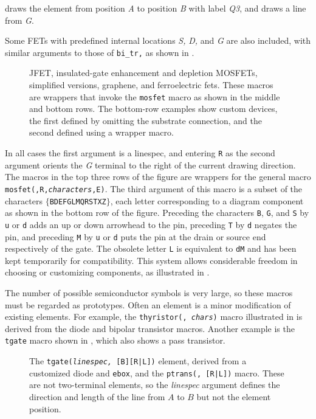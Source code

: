 \noindent
draws the element from position {\sl A} to position {\sl B} with label
{\sl Q3}, and draws a line from {\sl G}.

\enlargethispage{\baselineskip}
Some FETs with predefined internal locations {\sl S,} {\sl D,} and {\sl G} are
also included, with similar arguments to those of {\tt bi\_tr,} as shown in
.
\begin{figure}[ht]
   
   \caption{JFET, insulated-gate enhancement and depletion MOSFETs,
     simplified versions, graphene, and ferroelectric fets. 
     These macros are wrappers that invoke the {\tt mosfet}
     macro as shown in the middle and bottom rows.
     The bottom-row examples show custom devices, the first
     defined by omitting the substrate connection, and the second
     defined using a wrapper macro.}
   \label{fet}
   \end{figure}
In all cases the first argument is a linespec,
and entering
{\tt R} as the second argument orients the {\sl G} terminal to the right of the
current drawing direction.
The macros in the top three rows of the figure are wrappers for the
general macro {\tt mosfet(\linespec,R,{\sl characters},E)}.
The third argument of this macro is a subset of the characters
$\{${\tt BDEFGLMQRSTXZ}$\}$, each letter corresponding to
a diagram component as shown in the bottom row of the figure. 
Preceding the characters {\tt B}, {\tt G}, and {\tt S} by {\tt u} or {\tt d}
adds an up or down arrowhead to the pin, preceding {\tt T} by {\tt d}
negates the pin, and preceding {\tt M} by {\tt u} or {\tt d} puts the pin
at the drain or source end respectively of the gate.
The obsolete letter {\tt L} is equivalent to {\tt dM} and has been kept
temporarily for compatibility.
This system allows considerable freedom in choosing or customizing components,
as illustrated in .

The number of possible semiconductor symbols is very
large, so these macros must be regarded as prototypes.
Often an element is a minor modification of existing elements.  For example,
the {\tt thyristor(\linespec, {\sl chars})} macro illustrated in
 is derived from the diode and bipolar transistor macros.
Another example is the {\tt tgate} macro shown in , which
also shows a pass transistor.
\begin{figure}[h!t]
   
   \caption{The {\tt tgate({\sl linespec,} [B][R|L])} element, derived from
     a customized diode and {\tt ebox}, and the
     {\tt ptrans(\linespec, [R|L])} macro.
     These are not two-terminal elements, so the {\sl linespec} argument
     defines the direction and length of the line from $A$ to $B$ but not
     the element position.}
   \label{Tgate}
   \end{figure}

